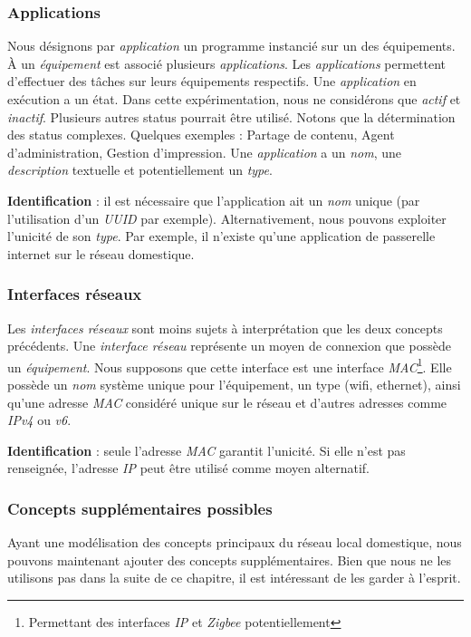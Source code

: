 \subsubsection{Applications}
Nous désignons par \textit{application} un programme instancié sur un des équipements. À un \textit{équipement} est associé plusieurs \textit{applications}. Les \textit{applications} permettent d'effectuer des tâches sur leurs équipements respectifs. Une \textit{application} en exécution a un état. Dans cette expérimentation, nous ne considérons que \textit{actif} et \textit{inactif}. Plusieurs autres status pourrait être utilisé. Notons que la détermination des status complexes. Quelques exemples : Partage de contenu, Agent d'administration, Gestion d'impression. Une \textit{application} a un \textit{nom}, une \textit{description} textuelle et potentiellement un \textit{type}.

\textbf{Identification} : il est nécessaire que l'application ait un \textit{nom} unique (par l'utilisation d'un \textit{UUID} par exemple). Alternativement, nous pouvons exploiter l'unicité de son \textit{type}. Par exemple, il n'existe qu'une application de passerelle internet sur le réseau domestique.

\subsubsection{Interfaces réseaux}
Les \textit{interfaces réseaux} sont moins sujets à interprétation que les deux concepts précédents. Une \textit{interface réseau} représente un moyen de connexion que possède un \textit{équipement}. Nous supposons que cette interface est une interface \textit{MAC}\footnote{Permettant des interfaces \textit{IP} et \textit{Zigbee} potentiellement}. Elle possède un \textit{nom} système unique pour l'équipement, un type (wifi, ethernet), ainsi qu'une adresse \textit{MAC} considéré unique sur le réseau et d'autres adresses comme \textit{IPv4} ou \textit{v6}.

\textbf{Identification} : seule l'adresse \textit{MAC} garantit l'unicité. Si elle n'est pas renseignée, l'adresse \textit{IP} peut être utilisé comme moyen alternatif.

\subsubsection{Concepts supplémentaires possibles}
Ayant une modélisation des concepts principaux du réseau local domestique, nous pouvons maintenant ajouter des concepts supplémentaires. Bien que nous ne les utilisons pas dans la suite de ce chapitre, il est intéressant de les garder à l'esprit.

